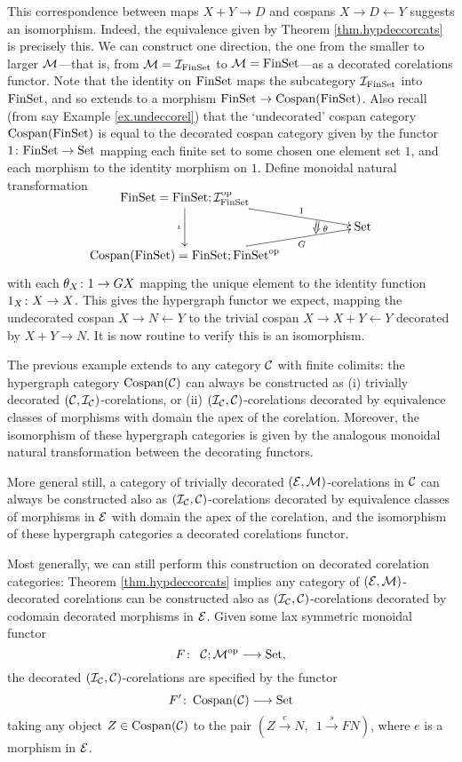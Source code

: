 \begin{example}
  This correspondence between maps $X+Y \to D$ and cospans $X \to D\leftarrow Y$
  suggests an isomorphism. Indeed, the equivalence given by Theorem
  \ref{thm.hypdeccorcats} is precisely this. We can construct one direction, the
  one from the smaller to larger $\mathcal M$---that is, from $\mathcal M = \mathcal
  I_{\mathrm{FinSet}}$ to $\mathcal M = \mathrm{FinSet}$---as a decorated corelations functor.  Note
  that the identity on $\mathrm{FinSet}$ maps the subcategory $\mathcal I_{\mathrm{FinSet}}$ into
  $\mathrm{FinSet}$, and so extends to a morphism $\mathrm{FinSet} \to \operatorname{{Cospan}}(\mathrm{FinSet})$. Also
  recall (from say Example \ref{ex.undeccorel}) that the `undecorated' cospan
  category $\operatorname{{Cospan}}(\mathrm{FinSet})$ is equal to the decorated cospan category given by
  the functor $1{\colon} \mathrm{FinSet} \to \mathrm{Set}$ mapping each finite set to some chosen
  one element set $1$, and each morphism to the identity morphism on $1$. Define
  monoidal natural transformation 
  \[
    \xymatrixrowsep{2ex}
    \xymatrix{
      \FinSet = \FinSet; \mc I_{\FinSet}^\opp \ar[dd]_{\iota} \ar[drr]^(.65)1  \\
      &\twocell \omit{_\:\theta}& \Set \\
      \cospan(\FinSet) = \FinSet; \FinSet^\opp \ar[urr]_(.65){G} 
    }
  \]
  with each $\theta_X {\colon} 1 \to GX$ mapping the unique element to the identity
  function $1_X{\colon} X \to X$.  This gives the hypergraph functor we expect,
  mapping the undecorated cospan $X \to N \leftarrow Y$ to the trivial cospan $X
  \to X+Y \leftarrow Y$ decorated by $X+Y \to N$. It is now routine to verify
  this is an isomorphism.
\end{example}

The previous example extends to any category $\mathcal C$ with finite colimits: the
hypergraph category $\operatorname{{Cospan}}(\mathcal C)$ can always be constructed as (i)
trivially decorated $(\mathcal C, \mathcal I_{\mathcal C})$-corelations, or (ii) $(\mathcal I_{\mathcal
C}, \mathcal C)$-corelations decorated by equivalence classes of morphisms with
domain the apex of the corelation. Moreover, the isomorphism of these
hypergraph categories is given by the analogous monoidal natural transformation
between the decorating functors.

More general still, a category of trivially decorated $(\mathcal E, \mathcal
M)$-corelations in $\mathcal C$ can always be constructed also as $(\mathcal I_{\mathcal C},
\mathcal C)$-corelations decorated by equivalence classes of morphisms in $\mathcal E$
with domain the apex of the corelation, and the isomorphism of these
hypergraph categories a decorated corelations functor.

Most generally, we can still perform this construction on decorated corelation
categories: Theorem \ref{thm.hypdeccorcats} implies any category of $(\mathcal E,\mathcal
M)$-decorated corelations can be constructed also as $(\mathcal I_{\mathcal C}, \mathcal
C)$-corelations decorated by codomain decorated morphisms in $\mathcal E$. Given some
lax symmetric monoidal functor
\[
  F{\colon} \enspace \mathcal C;\mathcal M^{\mathrm{op}} \longrightarrow \mathrm{Set},
\]
the decorated $(\mathcal I_{\mathcal C}, \mathcal C)$-corelations are specified by the functor
\[
  F'{\colon} \operatorname{{Cospan}}(\mathcal C) \longrightarrow \mathrm{Set}
\]
taking any object $Z \in \operatorname{{Cospan}}(\mathcal C)$ to the pair $(Z \stackrel{e}\to N,
\enspace 1\stackrel{s}\to FN)$, where $e$ is a morphism in $\mathcal E$.

